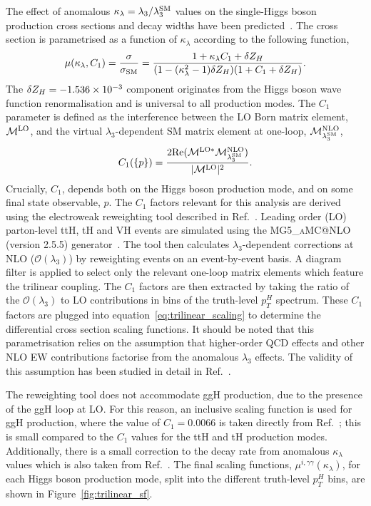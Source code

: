The effect of anomalous $\kappa_\lambda=\lambda_3/\lambda_3^{\rm{SM}}$ values on the single-Higgs boson production cross sections and decay widths have been predicted~\cite{Maltoni:2017ims}. The cross section is parametrised as a function of $\kappa_\lambda$ according to the following function,
\begin{equation}\label{eq:trilinear_scaling}
    \mu(\kappa_\lambda,C_1) = \frac{\sigma}{\sigma_{\rm{SM}}} = \frac{1+\kappa_\lambda C_1 + \delta Z_H}{(1-(\kappa_\lambda^2-1)\delta Z_H)(1+C_1+\delta Z_H)}.
\end{equation}
The $\delta Z_H=-1.536\times10^{\rm{-3}}$ component originates from the Higgs boson wave function renormalisation and is universal to all production modes. The $C_1$ parameter is defined as the interference between the LO Born matrix element, $\mathcal{M}^{\rm{LO}}$, and the virtual $\lambda_3$-dependent SM matrix element at one-loop, $\mathcal{M}^{\rm{NLO}}_{\lambda_3^{\rm{SM}}}$, 
\begin{equation}
    C_1(\{p\}) = \frac{2{\rm{Re}}(\mathcal{M}^{{\rm{LO}}*}\mathcal{M}^{\rm{NLO}}_{\lambda_3^{\rm{SM}}})}{|\mathcal{M}^{{\rm{LO}}}|^2}.
\end{equation}
\noindent
Crucially, $C_1$, depends both on the Higgs boson production mode, and on some final state observable, $p$. The $C_1$ factors relevant for this analysis are derived using the electroweak reweighting tool described in Ref.~\cite{EWreweightingtool}. Leading order (LO) parton-level ttH, tH and VH events are simulated using the \textsc{MG5\_aMC@NLO} (version 2.5.5) generator~\cite{Alwall:2014hca}. The tool then calculates $\lambda_3$-dependent corrections at NLO ($\mathcal{O}(\lambda_3)$) by reweighting events on an event-by-event basis. A diagram filter is applied to select only the relevant one-loop matrix elements which feature the trilinear coupling. The $C_1$ factors are then extracted by taking the ratio of the $\mathcal{O}(\lambda_3)$ to LO contributions in bins of the truth-level $p_T^H$ spectrum. These $C_1$ factors are plugged into equation~\ref{eq:trilinear_scaling} to determine the differential cross section scaling functions. It should be noted that this parametrisation relies on the assumption that higher-order QCD effects and other NLO EW contributions factorise from the anomalous $\lambda_3$ effects. The validity of this assumption has been studied in detail in Ref.~\cite{Maltoni:2017ims}.

The reweighting tool does not accommodate ggH production, due to the presence of the ggH loop at LO. For this reason, an inclusive scaling function is used for ggH production, where the value of $C_1=0.0066$ is taken directly from Ref.~\cite{Degrassi:2016wml}; this is small compared to the $C_1$ values for the ttH and tH production modes. Additionally, there is a small correction to the \Hgg decay rate from anomalous $\kappa_\lambda$ values which is also taken from Ref.~\cite{Degrassi:2016wml}. The final scaling functions, $\mu^{i,\gamma\gamma}(\kappa_\lambda)$, for each Higgs boson production mode, split into the different truth-level $p_T^H$ bins, are shown in Figure~\ref{fig:trilinear_sf}.


